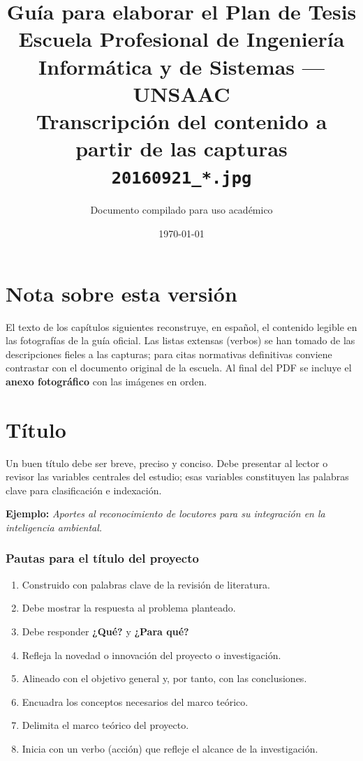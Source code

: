 \documentclass[a4paper,11pt]{book}
\title{\textbf{Guía para elaborar el Plan de Tesis}\\[0.3em]
\large Escuela Profesional de Ingeniería Informática y de Sistemas --- UNSAAC\\[0.5em]
\normalsize Transcripción del contenido a partir de las capturas \texttt{20160921\_*.jpg}}
\author{Documento compilado para uso académico}
\date{\today}
\begin{document}
\frontmatter
\maketitle
\tableofcontents
\mainmatter

\chapter*{Nota sobre esta versión}
El texto de los capítulos siguientes reconstruye, en español, el contenido legible en las fotografías de la guía oficial. Las listas extensas (verbos) se han tomado de las descripciones fieles a las capturas; para citas normativas definitivas conviene contrastar con el documento original de la escuela. Al final del PDF se incluye el \textbf{anexo fotográfico} con las imágenes en orden.


\chapter{Título}
\label{cap:titulo}

Un buen título debe ser breve, preciso y conciso. Debe presentar al lector o revisor las variables centrales del estudio; esas variables constituyen las palabras clave para clasificación e indexación.

\textbf{Ejemplo:} \textit{Aportes al reconocimiento de locutores para su integración en la inteligencia ambiental.}

\subsection*{Pautas para el título del proyecto}
\begin{enumerate}[leftmargin=*]
  \item Construido con palabras clave de la revisión de literatura.
  \item Debe mostrar la respuesta al problema planteado.
  \item Debe responder \textbf{¿Qué?} y \textbf{¿Para qué?}
  \item Refleja la novedad o innovación del proyecto o investigación.
  \item Alineado con el objetivo general y, por tanto, con las conclusiones.
  \item Encuadra los conceptos necesarios del marco teórico.
  \item Delimita el marco teórico del proyecto.
  \item Inicia con un verbo (acción) que refleje el alcance de la investigación.
\end{enumerate}
\end{document}
